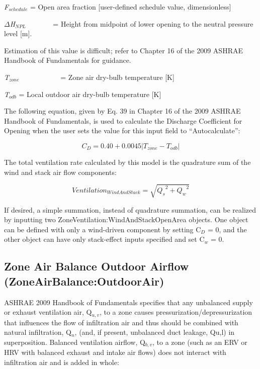 \emph{F\(_{schedule}\)} = Open area fraction {[}user-defined schedule value, dimensionless{]}

\emph{$\Delta$H\(_{NPL}\)}~~~~~~~ = Height from midpoint of lower opening to the neutral pressure level {[}m{]}.

Estimation of this value is difficult; refer to Chapter 16 of the 2009 ASHRAE Handbook of Fundamentals for guidance.

\emph{T\(_{zone}\)}~~~~~~~~~~~ = Zone air dry-bulb temperature {[}K{]}

\emph{T\(_{odb}\)} = Local outdoor air dry-bulb temperature {[}K{]}

The following equation, given by Eq. 39 in Chapter 16 of the 2009 ASHRAE Handbook of Fundamentals, is used to calculate the Discharge Coefficient for Opening when the user sets the value for this input field to ``Autocalculate'':

\begin{equation}
{C_D} = 0.40 + 0.0045\left| {{T_{zone}} - {T_{odb}}} \right|
\end{equation}

The total ventilation rate calculated by this model is the quadrature sum of the wind and stack air flow components:

\begin{equation}
Ventilatio{n_{WindAndStack}} = \sqrt {{Q_s}^2 + {Q_w}^2}
\end{equation}

If desired, a simple summation, instead of quadrature summation, can be realized by inputting two ZoneVentilation:WindAndStackOpenArea objects. One object can be defined with only a wind-driven component by setting C\(_{D}\) = 0, and the other object can have only stack-effect inputs specified and set C\(_{w}\) = 0.

\subsection{Zone Air Balance Outdoor Airflow (ZoneAirBalance:OutdoorAir)}\label{zone-air-balance-outdoor-airflow-zoneairbalanceoutdoorair}

ASHRAE 2009 Handbook of Fundamentals specifies that any unbalanced supply or exhaust ventilation air, Q\(_{u,v}\), to a zone causes pressurization/depressurization that influences the flow of infiltration air and thus should be combined with natural infiltration, Q\(_{n}\), (and, if present, unbalanced duct leakage, Qu,l) in superposition. Balanced ventilation airflow, Q\(_{b,v}\), to a zone (such as an ERV or HRV with balanced exhaust and intake air flows) does not interact with infiltration air and is added in whole:

